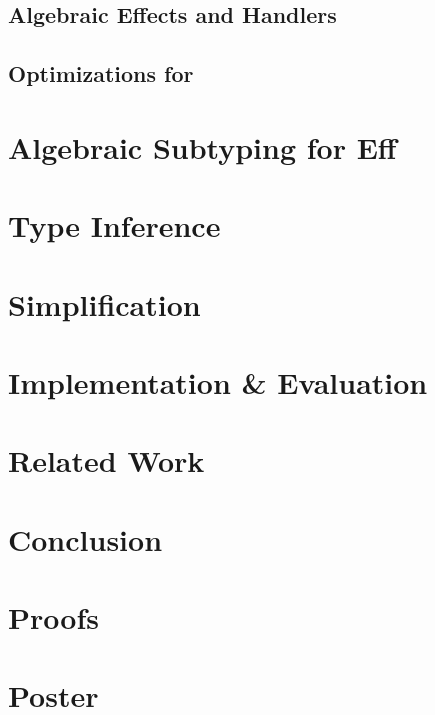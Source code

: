 \documentclass[master=ecws, masteroption=ai]{kulemt}
\begin{document}
  \section{Algebraic Effects and Handlers}\label{eff-chapter}
  
  
  

  \section{Optimizations for \eff}
  

\chapter{Algebraic Subtyping for Eff}\label{core}






\chapter{Type Inference}\label{type-inference}




\chapter{Simplification}\label{simplification}


\chapter{Implementation \& Evaluation}\label{implementation}



\chapter{Related Work}\label{related}


\chapter{Conclusion}\label{conclusion}


\appendixpage*
\appendix

\chapter{Proofs}\label{proofs}


\chapter{Poster}\label{poster}


\backmatter



\end{document}
